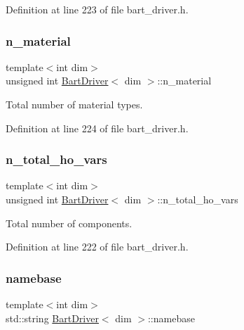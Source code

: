 Definition at line 223 of file bart\+\_\+driver.\+h.

\mbox{\label{class_bart_driver_ae6c9141662b95c89b674ccdc04e9233f}} 
\subsubsection{\texorpdfstring{n\+\_\+material}{n\_material}}
{\footnotesize\ttfamily template$<$int dim$>$ \\
unsigned int \hyperlink{class_bart_driver}{Bart\+Driver}$<$ dim $>$\+::n\+\_\+material\hspace{0.3cm}{\ttfamily [private]}}



Total number of material types. 



Definition at line 224 of file bart\+\_\+driver.\+h.

\mbox{\label{class_bart_driver_ab290f0bd63869bf124163f68e1be1a6a}} 
\subsubsection{\texorpdfstring{n\+\_\+total\+\_\+ho\+\_\+vars}{n\_total\_ho\_vars}}
{\footnotesize\ttfamily template$<$int dim$>$ \\
unsigned int \hyperlink{class_bart_driver}{Bart\+Driver}$<$ dim $>$\+::n\+\_\+total\+\_\+ho\+\_\+vars\hspace{0.3cm}{\ttfamily [private]}}



Total number of components. 



Definition at line 222 of file bart\+\_\+driver.\+h.

\mbox{\label{class_bart_driver_a34229e58237aaac1551db7a3ec140e1c}} 
\subsubsection{\texorpdfstring{namebase}{namebase}}
{\footnotesize\ttfamily template$<$int dim$>$ \\
std\+::string \hyperlink{class_bart_driver}{Bart\+Driver}$<$ dim $>$\+::namebase\hspace{0.3cm}{\ttfamily [private]}}



